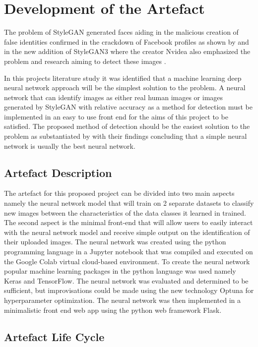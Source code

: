 \chapter{Development of the Artefact}\label{ch3}

The problem of StyleGAN generated faces aiding in the malicious creation of false identities confirmed in the crackdown of Facebook profiles as shown by \cite{Chandler2016} and in the new addition of StyleGAN3 where the creator Nvidea also emphasized the problem and research aiming to detect these images \citep{Karras2021}.

In this projects literature study it was identified that a machine learning deep neural network approach will be the simplest solution to the problem. A neural network that can identify images as either real human images or images generated by StyleGAN with relative accuracy as a method for detection must be implemented in an easy to use front end for the aims of this project to be satisfied. The proposed method of detection should be the easiest solution to the problem as substantiated by \cite{rasmussen2001} with their findings concluding that a simple neural network is usually the best neural network.

\section{Artefact Description}

The artefact for this proposed project can be divided into two main aspects namely the neural network model that will train on 2 separate datasets to classify new images between the characteristics of the data classes it learned in trained. The second aspect is the minimal front-end that will allow users to easily interact with the neural network model and receive simple output on the identification of their uploaded images. The neural network was created using the python programming language in a Jupyter notebook that was compiled and executed on the Google Colab virtual cloud-based environment. To create the neural network popular machine learning packages in the python language was used namely Keras and TensorFlow. The neural network was evaluated and determined to be sufficient, but improvisations could be made using the new technology Optuna for hyperparameter optimization. The neural network was then implemented in a minimalistic front end web app using the python web framework Flask.

\section{Artefact Life Cycle}

